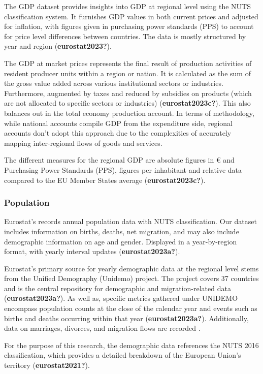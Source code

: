 \documentclass[
  a4paper,
  DIV=11,
  numbers=noendperiod]{scrartcl}
\begin{document}
The GDP dataset provides insights into GDP at regional level using the
NUTS classification system. It furnishes GDP values in both current
prices and adjusted for inflation, with figures given in purchasing
power standards (PPS) to account for price level differences between
countries. The data is mostly structured by year and region
(\textbf{eurostat2023?}).

The GDP at market prices represents the final result of production
activities of resident producer units within a region or nation. It is
calculated as the sum of the gross value added across various
institutional sectors or industries. Furthermore, augmented by taxes and
reduced by subsidies on products (which are not allocated to specific
sectors or industries) (\textbf{eurostat2023c?}). This also balances out
in the total economy production account. In terms of methodology, while
national accounts compile GDP from the expenditure side, regional
accounts don't adopt this approach due to the complexities of accurately
mapping inter-regional flows of goods and services.

The different measures for the regional GDP are absolute figures in €
and Purchasing Power Standards (PPS), figures per inhabitant and
relative data compared to the EU Member States average
(\textbf{eurostat2023c?}).

\hypertarget{population}{%
\subsubsection{Population}\label{population}}

Eurostat's records annual population data with NUTS classification. Our
dataset includes information on births, deaths, net migration, and may
also include demographic information on age and gender. Displayed in a
year-by-region format, with yearly interval updates
(\textbf{eurostat2023a?}).

Eurostat's primary source for yearly demographic data at the regional
level stems from the Unified Demography (Unidemo) project. The project
covers 37 countries and is the central repository for demographic and
migration-related data (\textbf{eurostat2023a?}). As well as, specific
metrics gathered under UNIDEMO encompass population counts at the close
of the calendar year and events such as births and deaths occurring
within that year (\textbf{eurostat2023a?}). Additionally, data on
marriages, divorces, and migration flows are recorded .

For the purpose of this research, the demographic data references the
NUTS 2016 classification, which provides a detailed breakdown of the
European Union's territory (\textbf{eurostat2021?}).
\end{document}

